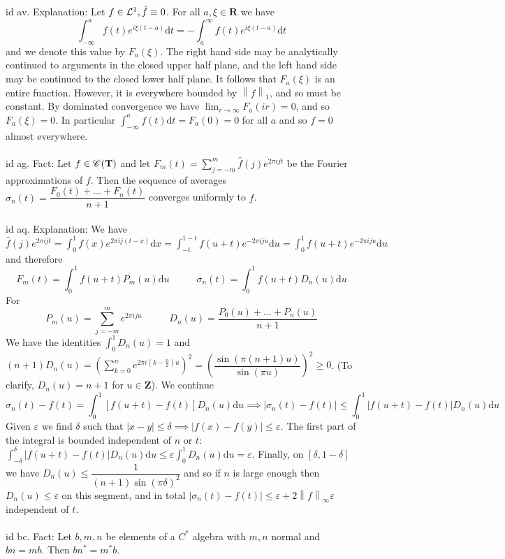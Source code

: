 \documentclass[oneside]{book}
\newcommand{\eps}{\varepsilon}
\newcommand{\Z}{\mathbf{Z}}
\newcommand{\R}{\mathbf{R}}
\newcommand{\T}{\mathbf{T}}
\newcommand{\fit}[1]{\left( #1\right)}
\newcommand{\abs}[1]{\left\lvert #1\right\rvert}
\newcommand{\norm}[1]{\left\lVert #1\right\rVert}
\renewcommand{\d}{\mathrm{d}}
\newcommand{\str}{^*}
\begin{document}
id av. Explanation: Let $f\in\mathcal{L}^1, \hat{f}\equiv 0$. For all $a,\xi\in\R$ we have
$$\int_{-\infty}^a f(t)e^{i\xi(t-a)}\d t=-\int_a^\infty f(t)e^{i\xi(t-a)}\d t$$
and we denote this value by $F_a(\xi)$. The right hand side may be analytically continued to arguments in the closed upper half plane, and the left hand side may be continued to the closed lower half plane. It follows that $F_a(\xi)$ is an entire function. However, it is everywhere bounded by $\norm{f}_1$, and so must be constant. By dominated convergence we have $\lim_{r\to\infty} F_a(ir)=0$, and so $F_a(\xi)=0$. In particular $\int_{-\infty}^a f(t)\d t=F_a(0)=0$ for all $a$ and so $f=0$ almost everywhere.    \\\\


id ag. Fact: Let $f\in\CC(\T)$ and let $F_m(t)=\displaystyle\sum_{j=-m}^m \hat{f}(j) e^{2\pi i jt}$ be the Fourier approximations of $f$. Then the sequence of averages $\sigma_n(t)=\dfrac{F_0(t)+\dots +F_n(t)}{n+1}$ converges uniformly to $f$. \\\\


id aq. Explanation: We have
$\hat{f}(j)e^{2\pi ijt}=\int_0^1 f(x)e^{2\pi i j(t-x)}\d x=\int_{-t}^{1-t}f(u+t)e^{-2\pi i j u}\d u=\int_{0}^{1}f(u+t)e^{-2\pi i j u}\d u$
and therefore 
$$F_m(t)=\int_0^1 f(u+t) P_m(u)\d u \phantom{---} \sigma_n(t)=\int_0^1 f(u+t) D_n(u)\d u $$
For
$$P_m(u)=\sum_{j=-m}^m e^{2\pi i j u} \phantom{---} D_n(u)=\dfrac{P_0(u)+\dots+P_n(u)}{n+1}$$
We have the identities $\displaystyle \int_0^1 D_n(u)=1$ and
$\displaystyle (n+1)D_n(u)=\fit{\sum_{k=0}^n e^{2\pi i(k-\frac{n}{2})u}}^2=\fit{\dfrac{\sin(\pi(n+1)u)}{\sin(\pi u)}}^2\ge0$. (To clarify, $D_n(u)=n+1$ for $u\in\Z$).
We continue
$$\sigma_n(t)-f(t)=\int_0^1  [f(u+t)-f(t)] D_n(u)\d u\implies \abs{\sigma_n(t)-f(t)}\le\int_0^1  \abs{f(u+t)-f(t)} D_n(u)\d u $$
Given $\eps$ we find $\delta$ such that
$\abs{x-y}\le\delta\implies\abs{f(x)-f(y)}\le\eps$.
The first part of the integral is bounded independent of $n$ or $t$: $ \int_{-\delta}^{\delta}  \abs{f(u+t)-f(t)} D_n(u)\d u\le \eps  \int_{0}^{1} D_n(u)\d u=\eps$. Finally, on $[\delta,1-\delta]$ we have $D_n(u)\le \dfrac{1}{(n+1)\sin(\pi\delta)^2}$
and so if $n$ is large enough then $D_n(u)\le \eps$ on this segment, and in total 
$\abs{\sigma_n(t)-f(t)}\le \eps+2\norm{f}_\infty\eps$
independent of $t$.     \\\\


id bc. Fact: Let $b,m,n$ be elements of a $C\str$ algebra with $m,n$ normal and $bn=mb$. Then $bn\str=m\str b$. \\\\
\end{document}
